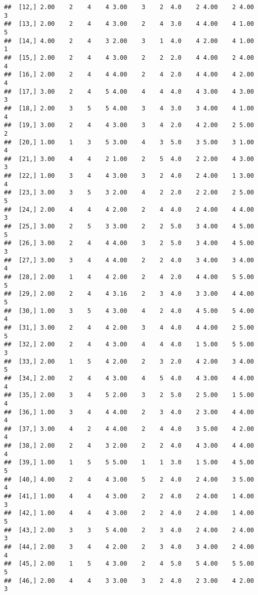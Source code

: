 \documentclass[]{article}
\begin{document}
\begin{verbatim}
##  [12,] 2.00    2    4    4 3.00    3    2  4.0    2 4.00    2 4.00    3
##  [13,] 2.00    2    4    4 3.00    2    4  3.0    4 4.00    4 1.00    5
##  [14,] 4.00    2    4    3 2.00    3    1  4.0    4 2.00    4 1.00    1
##  [15,] 2.00    2    4    4 3.00    2    2  2.0    4 4.00    2 4.00    4
##  [16,] 2.00    2    4    4 4.00    2    4  2.0    4 4.00    4 2.00    4
##  [17,] 3.00    2    4    5 4.00    4    4  4.0    4 3.00    4 3.00    3
##  [18,] 2.00    3    5    5 4.00    3    4  3.0    3 4.00    4 1.00    4
##  [19,] 3.00    2    4    4 3.00    3    4  2.0    4 2.00    2 5.00    2
##  [20,] 1.00    1    3    5 3.00    4    3  5.0    3 5.00    3 1.00    4
##  [21,] 3.00    4    4    2 1.00    2    5  4.0    2 2.00    4 3.00    3
##  [22,] 1.00    3    4    4 3.00    3    2  4.0    2 4.00    1 3.00    4
##  [23,] 3.00    3    5    3 2.00    4    2  2.0    2 2.00    2 5.00    5
##  [24,] 2.00    4    4    4 2.00    2    4  4.0    2 4.00    4 4.00    3
##  [25,] 3.00    2    5    3 3.00    2    2  5.0    3 4.00    4 5.00    5
##  [26,] 3.00    2    4    4 4.00    3    2  5.0    3 4.00    4 5.00    3
##  [27,] 3.00    3    4    4 4.00    2    2  4.0    3 4.00    3 4.00    4
##  [28,] 2.00    1    4    4 2.00    2    4  2.0    4 4.00    5 5.00    5
##  [29,] 2.00    2    4    4 3.16    2    3  4.0    3 3.00    4 4.00    5
##  [30,] 1.00    3    5    4 3.00    4    2  4.0    4 5.00    5 4.00    4
##  [31,] 3.00    2    4    4 2.00    3    4  4.0    4 4.00    2 5.00    5
##  [32,] 2.00    2    4    4 3.00    4    4  4.0    1 5.00    5 5.00    3
##  [33,] 2.00    1    5    4 2.00    2    3  2.0    4 2.00    3 4.00    5
##  [34,] 2.00    2    4    4 3.00    4    5  4.0    4 3.00    4 4.00    4
##  [35,] 2.00    3    4    5 2.00    3    2  5.0    2 5.00    1 5.00    4
##  [36,] 1.00    3    4    4 4.00    2    3  4.0    2 3.00    4 4.00    4
##  [37,] 3.00    4    2    4 4.00    2    4  4.0    3 5.00    4 2.00    4
##  [38,] 2.00    2    4    3 2.00    2    2  4.0    4 3.00    4 4.00    4
##  [39,] 1.00    1    5    5 5.00    1    1  3.0    1 5.00    4 5.00    5
##  [40,] 4.00    2    4    4 3.00    5    2  4.0    2 4.00    3 5.00    4
##  [41,] 1.00    4    4    4 3.00    2    2  4.0    2 4.00    1 4.00    3
##  [42,] 1.00    4    4    4 3.00    2    2  4.0    2 4.00    1 4.00    5
##  [43,] 2.00    3    3    5 4.00    2    3  4.0    2 4.00    2 4.00    3
##  [44,] 2.00    3    4    4 2.00    2    3  4.0    3 4.00    2 4.00    4
##  [45,] 2.00    1    5    4 3.00    2    4  5.0    5 4.00    5 5.00    5
##  [46,] 2.00    4    4    3 3.00    3    2  4.0    2 3.00    4 2.00    3

\end{verbatim}
\end{document}
